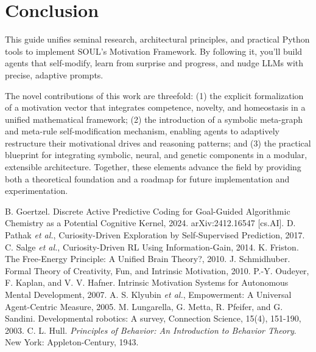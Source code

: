 \documentclass[11pt]{article}
\begin{document}
\section{Conclusion}
This guide unifies seminal research, architectural principles, and practical Python tools to implement SOUL’s Motivation Framework. By following it, you’ll build agents that self-modify, learn from surprise and progress, and nudge LLMs with precise, adaptive prompts.

The novel contributions of this work are threefold: (1) the explicit formalization of a motivation vector that integrates competence, novelty, and homeostasis in a unified mathematical framework; (2) the introduction of a symbolic meta-graph and meta-rule self-modification mechanism, enabling agents to adaptively restructure their motivational drives and reasoning patterns; and (3) the practical blueprint for integrating symbolic, neural, and genetic components in a modular, extensible architecture. Together, these elements advance the field by providing both a theoretical foundation and a roadmap for future implementation and experimentation.

\begin{thebibliography}{99}
 B. Goertzel. Discrete Active Predictive Coding for Goal-Guided Algorithmic Chemistry as a Potential Cognitive Kernel, 2024. arXiv:2412.16547 [cs.AI].
 D. Pathak \emph{et al.}, Curiosity-Driven Exploration by Self-Supervised Prediction, 2017.
 C. Salge \emph{et al.}, Curiosity-Driven RL Using Information-Gain, 2014.
 K. Friston. The Free-Energy Principle: A Unified Brain Theory?, 2010.
 J. Schmidhuber. Formal Theory of Creativity, Fun, and Intrinsic Motivation, 2010.
 P.-Y. Oudeyer, F. Kaplan, and V. V. Hafner. Intrinsic Motivation Systems for Autonomous Mental Development, 2007.
 A. S. Klyubin \emph{et al.}, Empowerment: A Universal Agent-Centric Measure, 2005.
 M. Lungarella, G. Metta, R. Pfeifer, and G. Sandini. Developmental robotics: A survey, Connection Science, 15(4), 151-190, 2003.
 C. L. Hull. \textit{Principles of Behavior: An Introduction to Behavior Theory}. New York: Appleton-Century, 1943.
\end{thebibliography}
\end{document}
